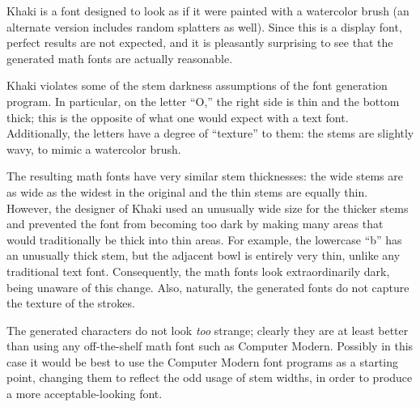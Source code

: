 
Khaki is a font designed to look as if it were painted with a watercolor brush
(an alternate version includes random splatters as well). Since this is a
display font, perfect results are not expected, and it is pleasantly surprising
to see that the generated math fonts are actually reasonable.

Khaki violates some of the stem darkness assumptions of the font generation
program. In particular, on the letter ``O,'' the right side is thin and the
bottom thick; this is the opposite of what one would expect with a text font.
Additionally, the letters have a degree of ``texture'' to them: the stems are
slightly wavy, to mimic a watercolor brush.

The resulting math fonts have very similar stem thicknesses: the wide stems are
as wide as the widest in the original and the thin stems are equally thin.
However, the designer of Khaki used an unusually wide size for the thicker stems
and prevented the font from becoming too dark by making many areas that would
traditionally be thick into thin areas. For example, the lowercase ``b'' has an
unusually thick stem, but the adjacent bowl is entirely very thin, unlike any
traditional text font. Consequently, the math fonts look extraordinarily dark,
being unaware of this change. Also, naturally, the generated fonts do not
capture the texture of the strokes.

The generated characters do not look \emph{too} strange; clearly they are at
least better than using any off-the-shelf math font such as Computer Modern.
Possibly in this case it would be best to use the Computer Modern font programs
as a starting point, changing them to reflect the odd usage of stem widths, in
order to produce a more acceptable-looking font.
